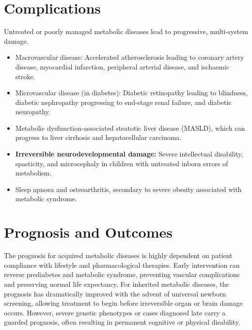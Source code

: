 \section*{Complications}
Untreated or poorly managed metabolic diseases lead to progressive, multi-system damage.
\begin{itemize}
    \item Macrovascular disease: Accelerated atherosclerosis leading to coronary artery disease, myocardial infarction, peripheral arterial disease, and ischaemic stroke.
    \item Microvascular disease (in diabetes): Diabetic retinopathy leading to blindness, diabetic nephropathy progressing to end-stage renal failure, and diabetic neuropathy.
    \item Metabolic dysfunction-associated steatotic liver disease (MASLD), which can progress to liver cirrhosis and hepatocellular carcinoma.
    \item \textbf{Irreversible neurodevelopmental damage:} Severe intellectual disability, spasticity, and microcephaly in children with untreated inborn errors of metabolism.
    \item Sleep apnoea and osteoarthritis, secondary to severe obesity associated with metabolic syndrome.
\end{itemize}

\section*{Prognosis and Outcomes}
The prognosis for acquired metabolic diseases is highly dependent on patient compliance with lifestyle and pharmacological therapies. Early intervention can reverse prediabetes and metabolic syndrome, preventing vascular complications and preserving normal life expectancy. For inherited metabolic diseases, the prognosis has dramatically improved with the advent of universal newborn screening, allowing treatment to begin before irreversible organ or brain damage occurs. However, severe genetic phenotypes or cases diagnosed late carry a guarded prognosis, often resulting in permanent cognitive or physical disability.

